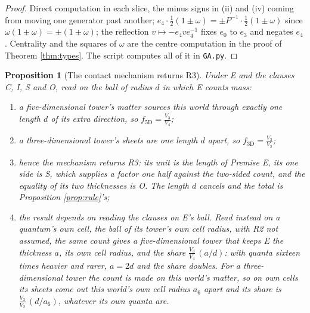 \documentclass[11pt]{article}
\newtheorem{proposition}[theorem]{Proposition}
\theoremstyle{definition}
\begin{document}
\begin{proof}
Direct computation in each slice, the minus signs in (ii) and (iv) coming from moving one generator past another; $e_{4}\cdot\tfrac{1}{2}(1 \pm \omega) = \pm P^{-1}\cdot\tfrac{1}{2}(1 \pm \omega)$ since $\omega(1 \pm \omega) = \pm(1 \pm \omega)$; the reflection $v \mapsto -e_{4}ve_{4}^{-1}$ fixes $e_{0}$ to $e_{3}$ and negates $e_{4}$. Centrality and the squares of $\omega$ are the centre computation in the proof of Theorem \ref{thm:types}. The script computes all of it in \texttt{GA.py}.
\end{proof}

\begin{proposition}[The contact mechanism returns R3]\label{prop:thickness}
Under E and the clauses C, I, S and O, read on the ball of radius $d$ in which E counts mass:
\begin{enumerate}
\item[(i)] a five-dimensional tower's matter sources this world through exactly one length $d$ of its extra direction, so $f_{5\mathrm{D}} = \tfrac{V_{3}}{V_{4}}$;
\item[(ii)] a three-dimensional tower's sheets are one length $d$ apart, so $f_{3\mathrm{D}} = \tfrac{V_{3}}{V_{2}}$;
\item[(iii)] hence the mechanism returns R3: its unit is the length of Premise E, its one side is S, which supplies a factor one half against the two-sided count, and the equality of its two thicknesses is O. The length $d$ cancels and the total is Proposition \ref{prop:rule}'s;
\item[(iv)] the result depends on reading the clauses on E's ball. Read instead on a quantum's own cell, the ball of its tower's own cell radius, with R2 not assumed, the same count gives a five-dimensional tower that keeps E the thickness $a$, its own cell radius, and the share $\tfrac{V_{3}}{V_{4}}\,(a/d)$: with quanta sixteen times heavier and rarer, $a = 2d$ and the share doubles. For a three-dimensional tower the count is made on this world's matter, so on own cells its sheets come out this world's own cell radius $a_{6}$ apart and its share is $\tfrac{V_{3}}{V_{2}}\,(d/a_{6})$, whatever its own quanta are.
\end{enumerate}
\end{proposition}
\end{document}
